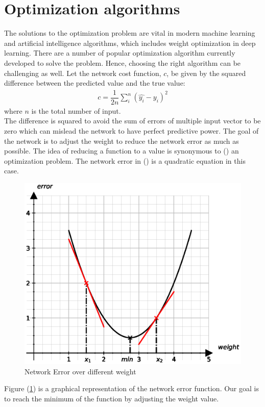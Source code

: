 \section{Optimization algorithms}
The solutions to the optimization problem are vital in modern machine learning and artificial intelligence algorithms, which includes weight optimization in deep learning. There are a number of popular optimization algorithm currently developed to solve the problem. Hence, choosing the right algorithm can be challenging as well.
Let the network cost function, $c$, be given by the squared difference between the predicted value and the true value:
\begin{align}
   c = \dfrac{1}{2n}\sum^{n}_i (\widehat{y_i}-y_i)^2
  \label{network_error}
\end{align}
where $n$ is the total number of input.\\
\noindent The difference is squared to avoid the sum of errors of multiple input vector to be zero which can mislead the network to have perfect predictive power. The goal of the network is to adjust the weight to reduce the network error as much as possible. The idea of reducing a function to a value is synonymous to () an optimization problem. The network error in () is a quadratic equation in this case.
\begin{figure}[H]
  \centering
  \includegraphics[scale=0.75]{CHAPTER_2/c2_fig_network_error_python.eps}
  \caption{Network Error over different weight}
  \label{network_error_graph}
\end{figure}
\noindent Figure (\ref*{network_error_graph}) is a graphical representation of the network error function. Our goal is to reach the minimum of the function by adjusting the weight value.
